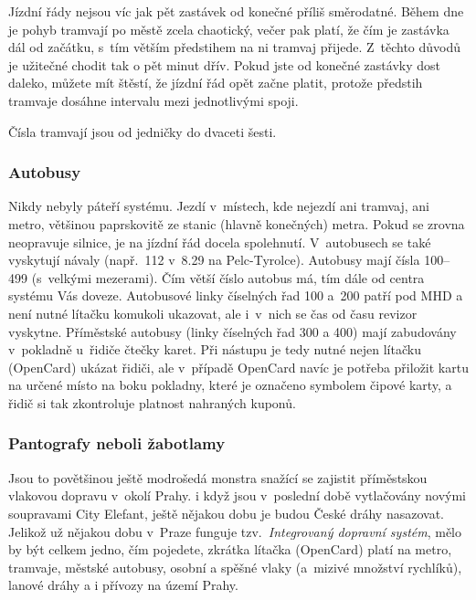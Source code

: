 Jízdní řády nejsou víc jak pět zastávek od konečné příliš
směrodatné. Během dne je pohyb tramvají po městě zcela chaotický,
večer pak platí, že čím je zastávka dál od začátku, s~tím větším
předstihem na ni tramvaj přijede. Z~těchto důvodů je užitečné
chodit tak o pět minut dřív. Pokud jste od konečné zastávky dost
daleko, můžete mít štěstí, že jízdní řád opět začne platit,
protože předstih tramvaje dosáhne intervalu mezi jednotlivými
spoji.

Čísla tramvají jsou od jedničky do dvaceti šesti.

\subsubsection{Autobusy}

Nikdy nebyly páteří systému. Jezdí v~místech, kde nejezdí ani
tramvaj, ani metro, většinou paprskovitě ze stanic (hlavně
konečných) metra. Pokud se zrovna neopravuje silnice, je na jízdní
řád docela spolehnutí. V~autobusech se také vyskytují návaly
(např.~112 v~8.29 na Pelc-Tyrolce). Autobusy mají čísla 100--499
(s~velkými mezerami). Čím větší číslo autobus má, tím dále od
centra systému Vás doveze. Autobusové linky číselných řad 100
a~200 patří pod MHD a není nutné lítačku komukoli ukazovat, ale
i~v~nich se čas od času revizor vyskytne. Příměstské autobusy (linky
číselných řad 300 a 400) mají zabudovány v~pokladně u~řidiče
čtečky karet. Při nástupu je tedy nutné nejen lítačku (OpenCard)
ukázat řidiči, ale v~případě OpenCard navíc je potřeba přiložit
kartu na určené místo na boku pokladny, které je označeno symbolem
čipové karty, a řidič si tak zkontroluje platnost nahraných
kuponů.

\subsubsection{Pantografy neboli žabotlamy}

Jsou to povětšinou ještě modrošedá monstra snažící se zajistit
příměstskou vlakovou dopravu v~okolí Prahy. i když jsou v~poslední
době vytlačovány novými soupravami City Elefant, ještě nějakou
dobu je budou České dráhy nasazovat. Jelikož už nějakou dobu
v~Praze funguje tzv.~{\it Integrovaný dopravní systém}, mělo by
být celkem jedno, čím pojedete, zkrátka lítačka (OpenCard) platí
na metro, tramvaje, městské autobusy, osobní a spěšné vlaky
(a~mizivé množství rychlíků), lanové dráhy a i přívozy na území
Prahy.

